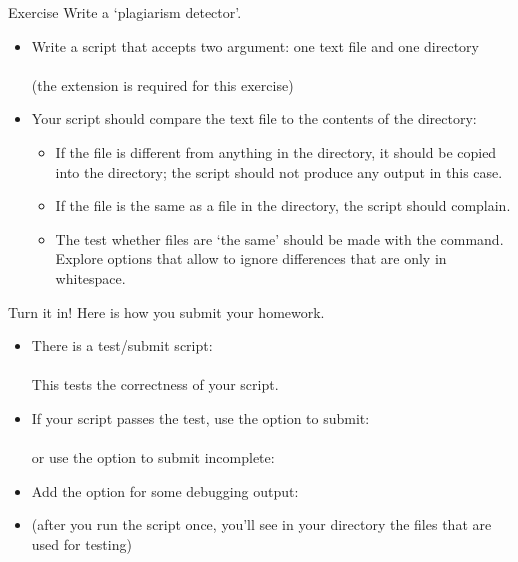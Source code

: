 \documentclass[11pt,headernav]{beamer}
\begin{document}
\begin{numberedframe}{Exercise}
  \label{sl-lnx:plag}
  Write a `plagiarism detector'.
  \begin{itemize}
  \item Write a script that accepts two argument: one text file and one directory\\
    \\
    (the  extension is required for this exercise)
  \item Your script should compare the text file to the contents of the directory:
    \begin{itemize}
    \item If the file is different from anything in the directory, it
      should be copied into the directory;
      the script should not produce any output in this case.
    \item If the file is the same as a file in the directory,
      the script should complain.
    \item The test whether files are `the same' should be made with the 
      command. Explore options that allow  to ignore differences that
      are only in whitespace.
    \end{itemize}
  \end{itemize}
\end{numberedframe}

\begin{numberedframe}{Turn it in!}
  \label{sl-lnx:plag-test}
  Here is how you submit your homework.
  \begin{itemize}
  \item There is a test/submit script:\\
    \\
    This tests the correctness of your script.
  \item If your script passes the test, use the  option to submit:\\
    \\
    or use the  option to submit incomplete:\\
  \item Add the  option for some debugging output:\\
  \item (after you run the script once, you'll see in your directory
    the files that are used for testing)
  \end{itemize}
\end{numberedframe}
\end{document}
